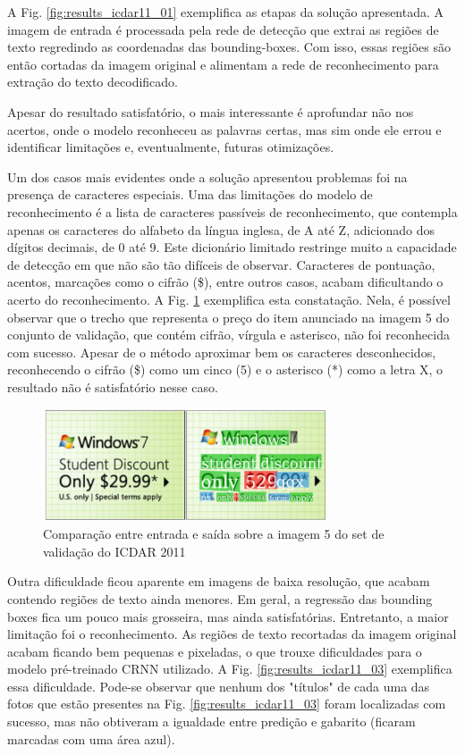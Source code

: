 A Fig. \ref{fig:results_icdar11_01} exemplifica as etapas da solução apresentada. A imagem de entrada é processada pela rede de detecção que extrai as regiões de texto regredindo as coordenadas das bounding-boxes. Com isso, essas regiões são então cortadas da imagem original e alimentam a rede de reconhecimento para extração do texto decodificado.

Apesar do resultado satisfatório, o mais interessante é aprofundar não nos acertos, onde o modelo reconheceu as palavras certas, mas sim onde ele errou e identificar limitações e, eventualmente, futuras otimizações.

Um dos casos mais evidentes onde a solução apresentou problemas foi na presença de caracteres especiais. Uma das limitações do modelo de reconhecimento é a lista de caracteres passíveis de reconhecimento, que contempla apenas os caracteres do alfabeto da língua inglesa, de A até Z, adicionado dos dígitos decimais, de 0 até 9. Este dicionário limitado restringe muito a capacidade de detecção em que não são tão difíceis de observar. Caracteres de pontuação, acentos, marcações como o cifrão (\$), entre outros casos, acabam dificultando o acerto do reconhecimento. A Fig. \ref{fig:results_icdar11_02} exemplifica esta constatação. Nela, é possível observar que o trecho que representa o preço do item anunciado na imagem 5 do conjunto de validação, que contém cifrão, vírgula e asterisco, não foi reconhecida com sucesso. Apesar de o método aproximar bem os caracteres desconhecidos, reconhecendo o cifrão (\$) como um cinco (5) e o asterisco (*) como a letra X, o resultado não é satisfatório nesse caso.

\begin{figure}
    \centering
    \includegraphics[width=0.75\textwidth]{figs/resultados-icdar11-02.png}
    \caption{Comparação entre entrada e saída sobre a imagem 5 do set de validação do ICDAR 2011}
    \label{fig:results_icdar11_02}
\end{figure}

Outra dificuldade ficou aparente em imagens de baixa resolução, que acabam contendo regiões de texto ainda menores. Em geral, a regressão das bounding boxes fica um pouco mais grosseira, mas ainda satisfatórias. Entretanto, a maior limitação foi o reconhecimento. As regiões de texto recortadas da imagem original acabam ficando bem pequenas e pixeladas, o que trouxe dificuldades para o modelo pré-treinado CRNN utilizado. A Fig. \ref{fig:results_icdar11_03} exemplifica essa dificuldade. Pode-se observar que nenhum dos "títulos" de cada uma das fotos que estão presentes na Fig. \ref{fig:results_icdar11_03} foram localizadas com sucesso, mas não obtiveram a igualdade entre predição e gabarito (ficaram marcadas com uma área azul).

